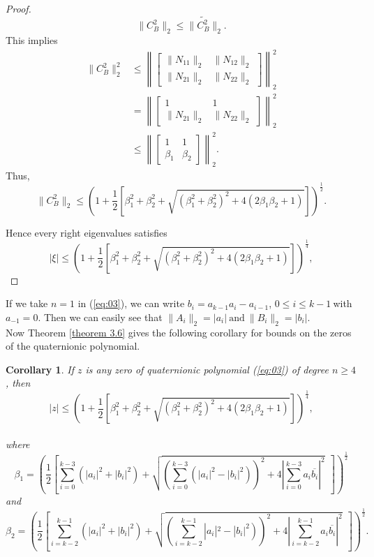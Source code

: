 \documentclass [12pt]{article}
\newtheorem{corollary}{Corollary}
[theorem]
\begin{document}
\begin{proof}
$$ \|C_{B}^{2}\|_2 \leq \|\tilde{C_{B}^{2}}\|_2. $$
This implies
\begin{align*}
   \|C_{B}^{2}\|^2_{2} &\le \left\| \begin{bmatrix} \|N_{11}\|_{2} &\|N_{12}\|_{2}\\ \|N_{21}\|_{2} & \|N_{22}\|_{2}\end{bmatrix} \right\|^2_{2} \\&=\left\| \begin{bmatrix} 1 &1\\ \|N_{21}\|_{2} & \|N_{22}\|_{2} \end{bmatrix} \right\|^2_{2}\\&\le \left\|\begin{bmatrix} 1 &1\\ \beta_{1} & \beta_{2} \end{bmatrix}\right\|^2_{2}.
\end{align*}
Thus, 
$$ \|C_{B}^{2}\|_{2} \le \left( 1+\frac{1}{2} \left[ \beta^{2}_{1} + \beta^{2}_{2} +\sqrt{(\beta^{2}_{1}+\beta^{2}_{2})^{2}+4\left(2\beta_{1}\beta_{2} + 1 \right) }\right] \right)^{\frac{1}{2}}.$$

\noindent Hence every right eigenvalues satisfies $$|\xi| \le \left( 1+\frac{1}{2} \left[ \beta^{2}_{1} + \beta^{2}_{2} +\sqrt{(\beta^{2}_{1}
+\beta^{2}_{2})^{2}+4\left(2\beta_{1}\beta_{2} + 1 \right) }\right] \right)^{\frac{1}{4}},$$
\end{proof}
\noindent 
If we take $n=1$ in (\ref{eq:03}), we can write $b_i = a_{k-1}a_i - a_{i-1}$, $0 \leq i \leq k-1~$with~ $a_{-1} = 0$. Then we can easily see that $\|A_{i}\|_{2}=|a_{i}|~\mbox{and}~\|B_{i}\|_{2}=|b_{i}|. $ \\Now Theorem \ref{theorem 3.6} gives the following corollary for bounds on the zeros of the quaternionic polynomial.

  \begin{corollary}
      If $z$ is any zero of quaternionic polynomial (\ref{eq:03}) of degree $n\ge 4$, then\\
    \begin{equation*}
|z| \le \left( 1+\frac{1}{2} \left[ \beta^{2}_{1} + \beta^{2}_{2} +\sqrt{(\beta^{2}_{1}
+\beta^{2}_{2})^{2}+4\left(2\beta_{1}\beta_{2} + 1 \right) }\right] \right)^{\frac{1}{4}},
\end{equation*}\\
where \begin{equation*}
 \beta_{1}=\left( \frac{1}{2} \left[ \sum_{i=0}^{k-3}\left(|a_{i}|^{2}+|b_{i}|^{2}\right)+\sqrt{ \left( \sum_{i=0}^{k-3}\left(|a_{i}|^{2}-|b_{i}|^{2} \right)     \right)^{2}            +4\left|\sum_{i=0}^{k-3}a_{i}\overline{b_{i}}\right|^{2} }~~\right]  \right)^{\frac{1}{2}}
\end{equation*}
and
\begin{equation*}
    \beta_{2}=\left( \frac{1}{2} \left[ \sum_{i=k-2}^{k-1}\left(|a_{i}|^{2}+|b_{i}|^{2}\right)+\sqrt{ \left( \sum_{i=k-2}^{k-1}\left|a_{i}|^{2}-|b_{i}|^{2} \right)     \right)^{2}            +4\left|\sum_{i=k-2}^{k-1}a_{i}\overline{b_{i}}\right|^{2} }~~\right]  \right)^{\frac{1}{2}}.
\end{equation*}
  \end{corollary}
\end{document}
